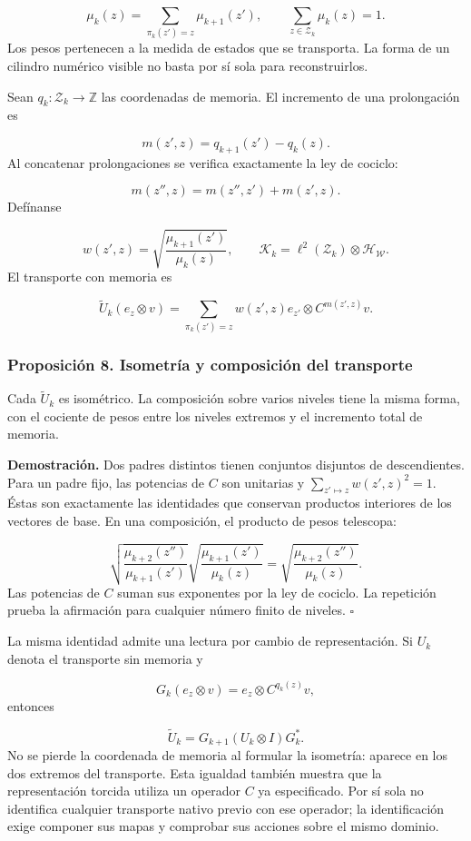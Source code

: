 \[
\mu_k(z)=\sum_{\pi_k(z')=z}\mu_{k+1}(z'),
\qquad \sum_{z\in\mathcal Z_k}\mu_k(z)=1.
\]
Los pesos pertenecen a la medida de estados que se transporta. La forma de un cilindro numérico visible no basta por sí sola para reconstruirlos.

Sean \(q_k:\mathcal Z_k\to\mathbb Z\) las coordenadas de memoria. El incremento de una prolongación es

\[
m(z',z)=q_{k+1}(z')-q_k(z).
\]
Al concatenar prolongaciones se verifica exactamente la ley de cociclo:

\[
m(z'',z)=m(z'',z')+m(z',z).
\]
Defínanse

\[
w(z',z)=
\sqrt{\frac{\mu_{k+1}(z')}{\mu_k(z)}},
\qquad
\mathcal K_k=\ell^2(\mathcal Z_k)\otimes\mathcal H_{\mathscr W}.
\]
El transporte con memoria es

\[
\widetilde U_k(e_z\otimes v)
=\sum_{\pi_k(z')=z}w(z',z)e_{z'}\otimes C^{m(z',z)}v.
\]
\subsubsection*{Proposición 8. Isometría y composición del transporte}
Cada \(\widetilde U_k\) es isométrico. La composición sobre varios niveles tiene la misma forma, con el cociente de pesos entre los niveles extremos y el incremento total de memoria.

\textbf{Demostración.} Dos padres distintos tienen conjuntos disjuntos de descendientes. Para un padre fijo, las potencias de \(C\) son unitarias y \(\sum_{z'\mapsto z}w(z',z)^2=1\). Éstas son exactamente las identidades que conservan productos interiores de los vectores de base. En una composición, el producto de pesos telescopa:

\[
\sqrt{\frac{\mu_{k+2}(z'')}{\mu_{k+1}(z')}}
\sqrt{\frac{\mu_{k+1}(z')}{\mu_k(z)}}
=\sqrt{\frac{\mu_{k+2}(z'')}{\mu_k(z)}}.
\]
Las potencias de \(C\) suman sus exponentes por la ley de cociclo. La repetición prueba la afirmación para cualquier número finito de niveles. \hfill\(\square\)

La misma identidad admite una lectura por cambio de representación. Si \(U_k\) denota el transporte sin memoria y

\[
G_k(e_z\otimes v)=e_z\otimes C^{q_k(z)}v,
\]
entonces

\[
\widetilde U_k=G_{k+1}(U_k\otimes I)G_k^*.
\]
No se pierde la coordenada de memoria al formular la isometría: aparece en los dos extremos del transporte. Esta igualdad también muestra que la representación torcida utiliza un operador \(C\) ya especificado. Por sí sola no identifica cualquier transporte nativo previo con ese operador; la identificación exige componer sus mapas y comprobar sus acciones sobre el mismo dominio.

